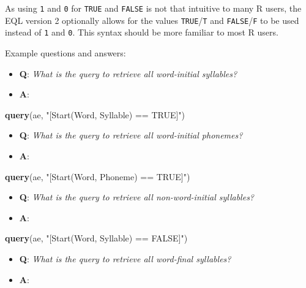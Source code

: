\documentclass[]{book}
\newenvironment{Shaded}{\begin{snugshade}}{\end{snugshade}}
\newcommand{\KeywordTok}[1]{\textcolor[rgb]{0.13,0.29,0.53}{\textbf{#1}}}
\newcommand{\NormalTok}[1]{#1}
\newcommand{\StringTok}[1]{\textcolor[rgb]{0.31,0.60,0.02}{#1}}
\providecommand{\tightlist}{%
  \setlength{\itemsep}{0pt}\setlength{\parskip}{0pt}}
\begin{document}
As using \texttt{1} and \texttt{0} for \texttt{TRUE} and \texttt{FALSE} is not that intuitive to many R users, the EQL version 2 optionally allows for the values \texttt{TRUE}/\texttt{T} and \texttt{FALSE}/\texttt{F} to be used instead of \texttt{1} and \texttt{0}. This syntax should be more familiar to most R users.

Example questions and answers:

\begin{itemize}
\tightlist
\item
  \textbf{Q}: \emph{What is the query to retrieve all word-initial syllables?}
\item
  \textbf{A}:
\end{itemize}

\begin{Shaded}
\begin{Highlighting}[]
\KeywordTok{query}\NormalTok{(ae, }\StringTok{"[Start(Word, Syllable) == TRUE]"}\NormalTok{)}
\end{Highlighting}
\end{Shaded}

\begin{itemize}
\tightlist
\item
  \textbf{Q}: \emph{What is the query to retrieve all word-initial phonemes?}
\item
  \textbf{A}:
\end{itemize}

\begin{Shaded}
\begin{Highlighting}[]
\KeywordTok{query}\NormalTok{(ae, }\StringTok{"[Start(Word, Phoneme) == TRUE]"}\NormalTok{)}
\end{Highlighting}
\end{Shaded}

\begin{itemize}
\tightlist
\item
  \textbf{Q}: \emph{What is the query to retrieve all non-word-initial syllables?}
\item
  \textbf{A}:
\end{itemize}

\begin{Shaded}
\begin{Highlighting}[]
\KeywordTok{query}\NormalTok{(ae, }\StringTok{"[Start(Word, Syllable) == FALSE]"}\NormalTok{)}
\end{Highlighting}
\end{Shaded}

\begin{itemize}
\tightlist
\item
  \textbf{Q}: \emph{What is the query to retrieve all word-final syllables?}
\item
  \textbf{A}:
\end{itemize}
\end{document}
